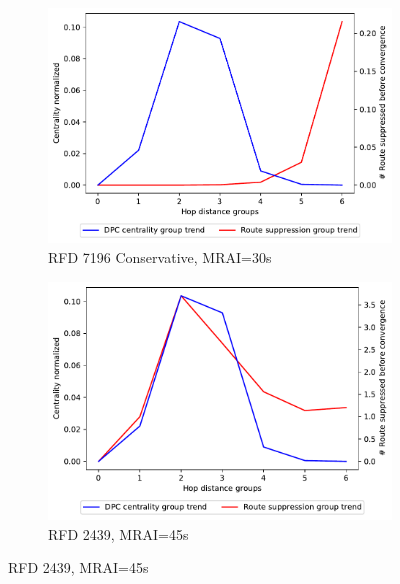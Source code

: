 \begin{figure}[H]
\begin{subfigure}[b]{0.325\textwidth}
     \end{subfigure}
     \hfill
     \begin{subfigure}[b]{0.325\textwidth}
         \centering
         \includegraphics[width=\textwidth]{images/RFD/miceVSelephants/MultiMRAI/30/mice/cisco_1000_RFD_7196_conservative_nodeConvergence_centVSsup_trend.pdf}
         \caption{\scriptsize RFD 7196 Conservative, MRAI=30s}
         \label{fig:1000_7196RFDC_centVSsup_mices_MRAI30}
     \end{subfigure}
     \vfill
     \begin{subfigure}[b]{0.325\textwidth}
         \centering
         \includegraphics[width=\textwidth]{images/RFD/miceVSelephants/MultiMRAI/45/mice/cisco_1000_RFD_nodeConvergence_centVSsup_trend.pdf}
         \caption{\scriptsize RFD 2439, MRAI=45s}
         \label{fig:1000_2439RFD_centVSsup_mices_MRAI45}

\end{subfigure}
\end{figure}
